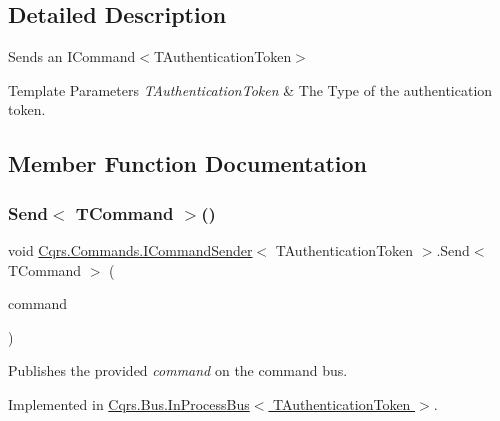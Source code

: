 \subsection{Detailed Description}
Sends an I\+Command$<$\+T\+Authentication\+Token$>$ 


\begin{DoxyTemplParams}{Template Parameters}
{\em T\+Authentication\+Token} & The Type of the authentication token.\\
\hline
\end{DoxyTemplParams}


\subsection{Member Function Documentation}
\mbox{\label{interfaceCqrs_1_1Commands_1_1ICommandSender_a551d69f8679399fc0ce0fd99dead507a_a551d69f8679399fc0ce0fd99dead507a}} 
\subsubsection{\texorpdfstring{Send$<$ T\+Command $>$()}{Send< TCommand >()}\hspace{0.1cm}{\footnotesize\ttfamily [1/2]}}
{\footnotesize\ttfamily void \hyperlink{interfaceCqrs_1_1Commands_1_1ICommandSender}{Cqrs.\+Commands.\+I\+Command\+Sender}$<$ T\+Authentication\+Token $>$.Send$<$ T\+Command $>$ (\begin{DoxyParamCaption}\item[{T\+Command}]{command }\end{DoxyParamCaption})}



Publishes the provided {\itshape command}  on the command bus. 



Implemented in \hyperlink{classCqrs_1_1Bus_1_1InProcessBus_a6a074ef3663d2855875307b106fe4416_a6a074ef3663d2855875307b106fe4416}{Cqrs.\+Bus.\+In\+Process\+Bus$<$ T\+Authentication\+Token $>$}.

